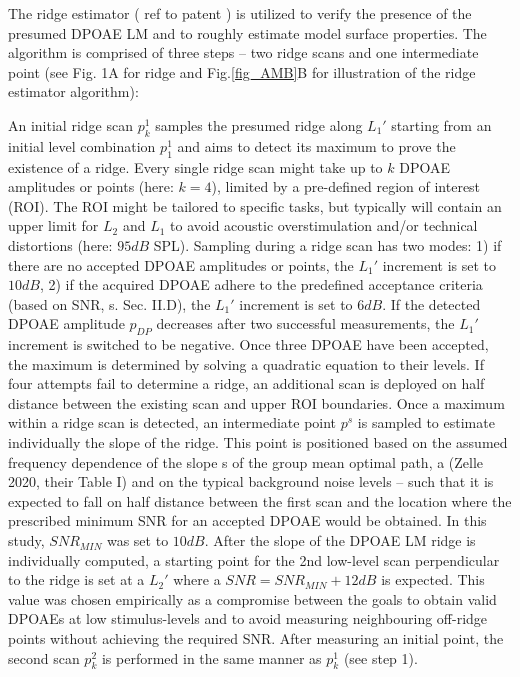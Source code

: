\documentclass[journal,twoside,web]{ieeecolor2}
\begin{document}
The ridge estimator ( ref to patent ) is utilized to verify the presence of the presumed DPOAE LM and to roughly estimate model surface properties.
The algorithm is comprised of three steps – two ridge scans and one intermediate point (see Fig.
1A for ridge and Fig.\ref{fig_AMB}B for illustration of the ridge estimator algorithm):
\begin{algorithmic}[1]
\STATE An initial ridge scan $p_k^1$ samples the presumed ridge along $L_1'$ starting from an initial level combination $p_1^1$ and aims to detect its maximum to prove the existence of a ridge.
Every single ridge scan might take up to $k$ DPOAE amplitudes or points (here: $k=4$), limited by a pre-defined region of interest (ROI).
The ROI might be tailored to specific tasks, but typically will contain an upper limit for $L_2$ and $L_1$ to avoid acoustic overstimulation and/or technical distortions (here: $95 dB$ SPL).
Sampling during a ridge scan has two modes: 1) if there are no accepted DPOAE amplitudes or points, the $L_1'$ increment is set to $10 dB$, 2) if the acquired DPOAE adhere to the predefined acceptance criteria (based on SNR, s.
Sec.
II.D), the $L_1'$ increment is set to $6 dB$.
If the detected DPOAE amplitude $p_{DP}$ decreases after two successful measurements, the $L_1'$ increment is switched to be negative.
Once three DPOAE have been accepted, the maximum is determined by solving a quadratic equation to their levels.
If four attempts fail to determine a ridge, an additional scan is deployed on half distance between the existing scan and upper ROI boundaries.
\STATE Once a maximum within a ridge scan is detected, an intermediate point $p^s$ is sampled to estimate individually the slope of the ridge.
This point is positioned based on the assumed frequency dependence of the slope s of the group mean optimal path, a (Zelle 2020, their Table I) and on the typical background noise levels – such that it is expected to fall on half distance between the first scan and the location where the prescribed minimum SNR for an accepted DPOAE would be obtained.
In this study, $SNR_{MIN}$ was set to $10 dB$.
\STATE After the slope of the DPOAE LM ridge is individually computed, a starting point for the 2nd low-level scan perpendicular to the ridge is set at a $L_2'$ where a $SNR = SNR_{MIN} + 12 dB$ is expected.
This value was chosen empirically as a compromise between the goals to obtain valid DPOAEs at low stimulus-levels and to avoid measuring neighbouring off-ridge points without achieving the required SNR.
After measuring an initial point, the second scan $p_k^2$ is performed in the same manner as $p_k^1$ (see step 1).
\end{algorithmic} 
\end{document}
